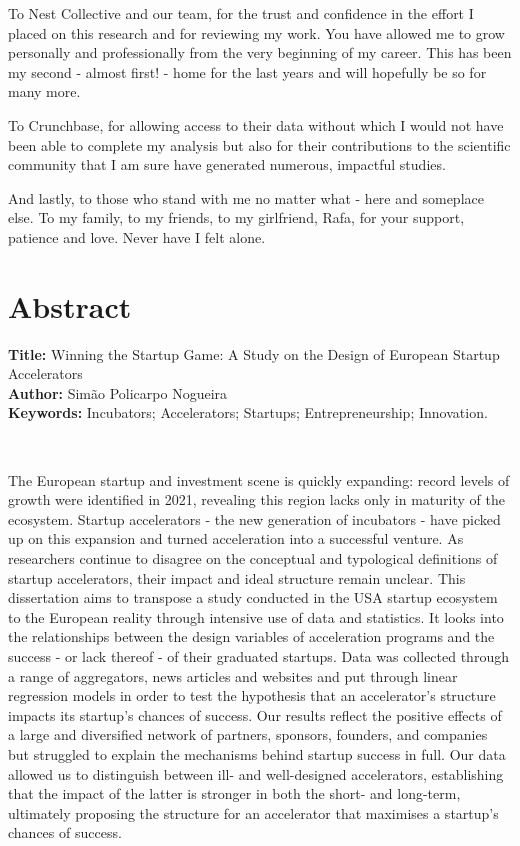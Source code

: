 \documentclass[
  12pt,
]{article}
\begin{document}
To Nest Collective and our team, for the trust and confidence in the effort I placed on this research and for reviewing my work. You have allowed me to grow personally and professionally from the very beginning of my career. This has been my second - almost first! - home for the last years and will hopefully be so for many more.

To Crunchbase, for allowing access to their data without which I would not have been able to complete my analysis but also for their contributions to the scientific community that I am sure have generated numerous, impactful studies.

And lastly, to those who stand with me no matter what - here and someplace else. To my family, to my friends, to my girlfriend, Rafa, for your support, patience and love. Never have I felt alone.

\clearpage

\hypertarget{abstract}{%
\section*{Abstract}\label{abstract}}

\textbf{Title:} Winning the Startup Game: A Study on the Design of European Startup Accelerators\\
\textbf{Author:} Simão Policarpo Nogueira\\
\textbf{Keywords:} Incubators; Accelerators; Startups; Entrepreneurship; Innovation.

~

The European startup and investment scene is quickly expanding: record levels of growth were identified in 2021, revealing this region lacks only in maturity of the ecosystem. Startup accelerators - the new generation of incubators - have picked up on this expansion and turned acceleration into a successful venture. As researchers continue to disagree on the conceptual and typological definitions of startup accelerators, their impact and ideal structure remain unclear. This dissertation aims to transpose a study conducted in the USA startup ecosystem to the European reality through intensive use of data and statistics. It looks into the relationships between the design variables of acceleration programs and the success - or lack thereof - of their graduated startups. Data was collected through a range of aggregators, news articles and websites and put through linear regression models in order to test the hypothesis that an accelerator's structure impacts its startup's chances of success. Our results reflect the positive effects of a large and diversified network of partners, sponsors, founders, and companies but struggled to explain the mechanisms behind startup success in full. Our data allowed us to distinguish between ill- and well-designed accelerators, establishing that the impact of the latter is stronger in both the short- and long-term, ultimately proposing the structure for an accelerator that maximises a startup's chances of success.
\end{document}

